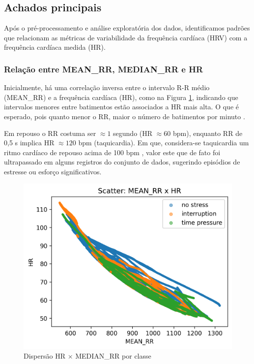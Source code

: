 \documentclass[conference]{IEEEtran}
\begin{document}
\subsection{Achados principais}

Após o pré-processamento e análise exploratória dos dados, identificamos padrões que relacionam as métricas de variabilidade da frequência cardíaca (HRV) com a frequência cardíaca medida (HR).

\subsubsection{Relação entre MEAN\_RR, MEDIAN\_RR e HR}

Inicialmente, há uma correlação inversa entre o intervalo R-R médio (MEAN\_RR) e a frequência cardíaca (HR), como na Figura \ref{fig:hr_median_rr}, indicando que intervalos menores entre batimentos estão associados a HR mais alta. O que é esperado, pois quanto menor o RR, maior o número de batimentos por minuto \cite{R1}.

Em repouso o RR costuma ser $\approx1$ segundo (HR $\approx60$ bpm), enquanto RR de 0,5 s implica HR $\approx120$ bpm (taquicardia). Em que, considera-se taquicardia um ritmo cardíaco de repouso acima de 100 bpm \cite{R2}, valor este que de fato foi ultrapassado em alguns registros do conjunto de dados, sugerindo episódios de estresse ou esforço significativos.

\begin{figure}[H]
    \centering
    \includegraphics[width=0.8\linewidth]{../../../images/Anderson/Scatter_Condicional/Scatter MEAN_RR x HR.png}
    \caption{Dispersão HR × MEDIAN\_RR por classe}
    \label{fig:hr_median_rr}
\end{figure}
\end{document}
